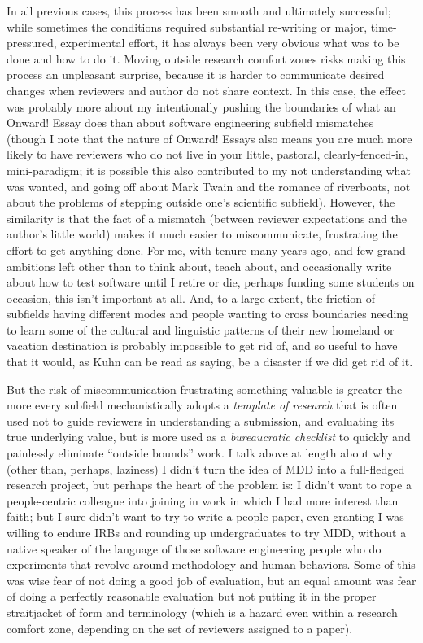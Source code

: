\documentclass[sigplan,screen]{acmart}
\begin{document}
In all previous cases, this
process has been smooth and ultimately successful; while sometimes the
conditions required substantial
re-writing or major, time-pressured, experimental effort, it has always been very obvious what
was to be done and how to do it.  Moving outside research comfort
zones risks making this process an unpleasant surprise, because it is
harder to communicate desired changes when reviewers and author do not
share context.  In this case, the effect was probably more about my intentionally
pushing the boundaries of what an Onward! Essay does than about
software engineering subfield mismatches (though I note that the
nature of Onward! Essays also means you are much more likely to have
reviewers who do not live in your little, pastoral, clearly-fenced-in,
mini-paradigm; it is possible this also contributed to my not
understanding what was wanted, and going off about Mark Twain and the
romance of riverboats, not about the problems of stepping outside
one's scientific subfield).  However, the similarity is that the
fact of a mismatch (between reviewer expectations and the author's
little world) makes it much easier to miscommunicate, frustrating the
effort to get anything done.  For me, with tenure many years ago, and few grand ambitions left
other than to think about, teach about, and occasionally write about how to test software until I retire or die,
perhaps funding some students on occasion, this isn't important at
all.  And, to a large extent, the friction of subfields having
different modes and people wanting to cross boundaries needing to
learn some of the cultural and linguistic patterns of their new
homeland or vacation destination is probably impossible to get rid of,
and so useful to have that it would, as Kuhn can be read as saying, be a disaster if we did get rid of it.

But the risk of miscommunication frustrating something valuable is
greater the more every subfield mechanistically adopts a
\emph{template of research} that is often used not to guide reviewers
in understanding a submission, and evaluating its true underlying
value, but is more used as a \emph{bureaucratic checklist} to quickly
and painlessly eliminate ``outside bounds'' work.  I talk above at length
about why (other than, perhaps, laziness) I didn't turn the idea of
MDD into a full-fledged research project, but perhaps the heart of the
problem is:  I didn't want to rope a people-centric colleague into
joining in work in which I had more interest than faith; but I sure
didn't want to try to write a people-paper, even granting I was
willing to endure IRBs and rounding up undergraduates to try
MDD, without a native speaker of the language of those software engineering
people who do experiments that revolve around methodology and human
behaviors.  Some of this was wise fear of not doing a good job of
evaluation, but an equal amount was fear of doing a perfectly
reasonable evaluation but not putting it in the proper straitjacket of
form and terminology (which is a hazard even within a research comfort zone,
depending on the set of reviewers assigned to a paper).
\end{document}
